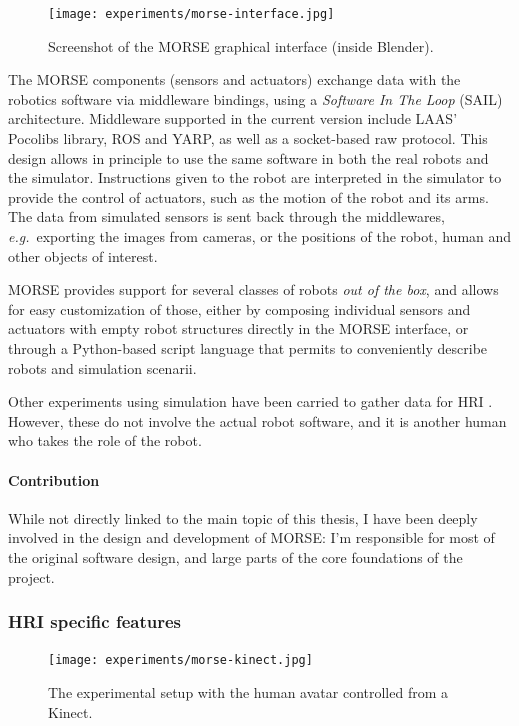 \begin{figure}[t]
      \centering
      \texttt{[image: experiments/morse-interface.jpg]}
      \caption{Screenshot of the MORSE graphical interface (inside Blender).}
      \label{fig|morse-gui}
\end{figure}


The MORSE components (sensors and actuators) exchange data with the robotics
software via middleware bindings, using a \emph{Software In The Loop} (SAIL)
architecture. Middleware supported in the current version include LAAS'
Pocolibs library, ROS and YARP, as well as a socket-based raw protocol. This
design allows in principle to use the same software in both the real robots and
the simulator. Instructions given to the robot are interpreted in the simulator
to provide the control of actuators, such as the motion of the robot and its
arms.  The data from simulated sensors is sent back through the middlewares,
{\it e.g.}~exporting the images from cameras, or the positions of the robot,
human and other objects of interest.

MORSE provides support for several classes of robots \textit{out of the box}, and
allows for easy customization of those, either by composing individual sensors
and actuators with empty robot structures directly in the MORSE interface, or
through a Python-based script language that permits to conveniently describe
robots and simulation scenarii.

Other experiments using simulation have been carried to gather data for HRI
\cite{Chernova2011}. However, these do not involve the actual robot software,
and it is another human who takes the role of the robot.

\paragraph{Contribution} While not directly linked to the main topic of this
thesis, I have been deeply involved in the design and development of MORSE: I'm
responsible for most of the original software design, and large parts of the
core foundations of the project.

\subsubsection{HRI specific features}
\label{sect|morse-hri}

\begin{figure}[t]
      \centering
      \texttt{[image: experiments/morse-kinect.jpg]}
      \caption{The experimental setup with the human avatar controlled from a
      Kinect.}
      \label{fig|kinect-setup}
\end{figure}

